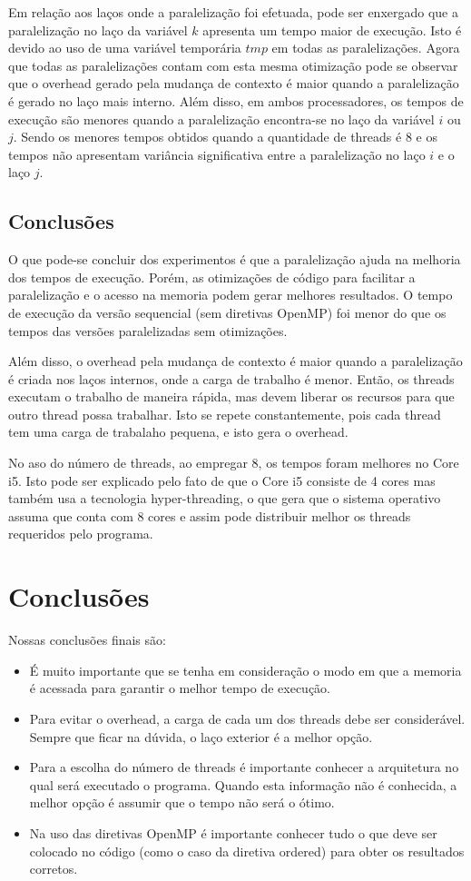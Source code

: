 \documentclass[a4paper,12pt,fleqn]{article}
\begin{document}
Em relação aos laços onde a paralelização foi efetuada, pode ser enxergado que a paralelização no laço da variável $k$ apresenta um tempo maior de execução. Isto é devido ao uso de uma variável temporária $tmp$ em todas as paralelizações. Agora que todas as paralelizações contam com esta mesma otimização pode se observar que o overhead gerado pela mudança de contexto é maior quando a paralelização é gerado no laço mais interno. Além disso, em ambos processadores, os tempos de execução são menores quando a paralelização encontra-se no laço da variável $i$ ou $j$. Sendo os menores tempos obtidos quando a quantidade de threads é 8 e os tempos não apresentam variância significativa entre a paralelização no laço $i$ e o laço $j$. 

\subsection{Conclusões} 
O que pode-se concluir dos experimentos é que a paralelização ajuda na melhoria dos tempos de execução. Porém, as otimizações de código para facilitar a paralelização e o acesso na memoria podem gerar melhores resultados. O tempo de execução da versão sequencial (sem diretivas OpenMP) foi menor do que os tempos das versões paralelizadas sem otimizações. 

Além disso, o overhead pela mudança de contexto é maior quando a paralelização é criada nos laços internos, onde a carga de trabalho é menor. Então, os threads executam o trabalho de maneira rápida, mas devem liberar os recursos para que outro thread possa trabalhar. Isto se repete constantemente, pois cada thread tem uma carga de trabalaho pequena, e isto gera o overhead. 

No aso do número de threads, ao empregar 8, os tempos foram melhores no Core i5. Isto pode ser explicado pelo fato de que o Core i5 consiste de 4 cores mas também usa a tecnologia hyper-threading, o que gera que o sistema operativo assuma que conta com 8 cores e assim pode distribuir melhor os threads requeridos pelo programa. 

\clearpage 

\section{Conclusões} 
Nossas conclusões finais são:
\begin{itemize}
    \item É muito importante que se tenha em consideração o modo em que a memoria é acessada para garantir o melhor tempo de execução.
    \item Para evitar o overhead, a carga de cada um dos threads debe ser considerável. Sempre que ficar na dúvida, o laço exterior é a melhor opção. 
    \item Para a escolha do número de threads é importante conhecer a arquitetura no qual será executado o programa. Quando esta informação não é conhecida, a melhor opção é assumir que o tempo não será o ótimo.
    \item Na uso das diretivas OpenMP é importante conhecer tudo o que deve ser colocado no código (como o caso da diretiva ordered) para obter os resultados corretos.
\end{itemize}
 
\end{document}
